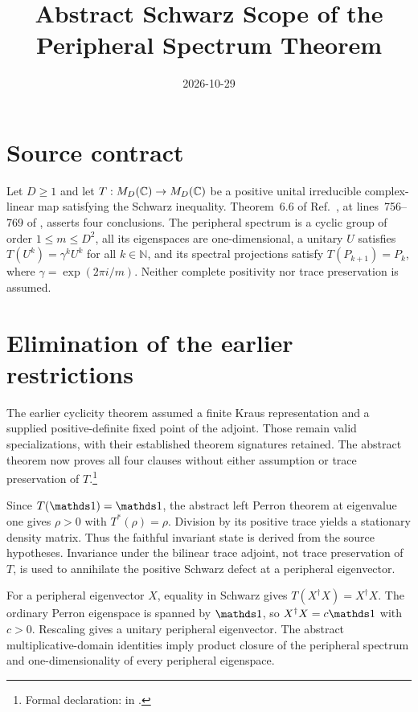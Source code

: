 \documentclass[11pt]{article}
\title{Abstract Schwarz Scope of the Peripheral Spectrum Theorem}
\author{}
\date{2026-10-29}
\begin{document}
\maketitle
{}

\section{Source contract}

Let $D\geq1$ and let $T:M_{D}(\mathbb{C})\to M_{D}(\mathbb{C})$ be a positive unital irreducible
complex-linear map satisfying the Schwarz inequality. Theorem~6.6 of
Ref.~\cite{Wolf2012Quantum}, at lines~756--769 of
, asserts four
conclusions. The peripheral spectrum is a cyclic group of order
$1\leq m\leq D^2$, all its eigenspaces are one-dimensional, a unitary $U$
satisfies $T(U^k)=\gamma^kU^k$ for all $k\in\mathbb{N}$, and its spectral
projections satisfy $T(P_{k+1})=P_k$, where $\gamma=\exp(2\pi i/m)$.
Neither complete positivity nor trace preservation is assumed.

\section{Elimination of the earlier restrictions}

The earlier cyclicity theorem assumed a finite Kraus representation and a
supplied positive-definite fixed point of the adjoint. Those remain valid
specializations, with their established theorem signatures retained. The
abstract theorem now proves all four clauses without either assumption or
trace preservation of $T$.\footnote{Formal declaration:
 in
.}

Since $T(\Id)=\Id$, the abstract left Perron theorem at eigenvalue one gives
$\rho>0$ with $T^*(\rho)=\rho$. Division by its positive trace yields a
stationary density matrix. Thus the faithful invariant state is derived
from the source hypotheses. Invariance under the bilinear trace adjoint,
not trace preservation of $T$, is used to annihilate the positive Schwarz
defect at a peripheral eigenvector.

For a peripheral eigenvector $X$, equality in Schwarz gives
$T(X^\dagger X)=X^\dagger X$. The ordinary Perron eigenspace is spanned by
$\Id$, so $X^\dagger X=c\Id$ with $c>0$. Rescaling gives a unitary
peripheral eigenvector. The abstract multiplicative-domain identities imply
product closure of the peripheral spectrum and one-dimensionality of every
peripheral eigenspace.
\end{document}
